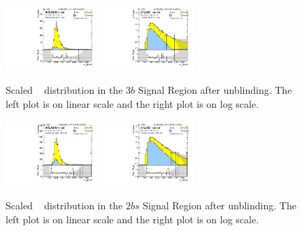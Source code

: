 \begin{figure}[htbp!]
\begin{center}
\includegraphics[width=0.31\textwidth,angle=-90]{figures/boosted/Signal_Syst/Moriond_bkg_9_ThreeTag_Signal_mHH_pole.pdf}
\includegraphics[width=0.31\textwidth,angle=-90]{figures/boosted/Signal_Syst/Moriond_bkg_9_ThreeTag_Signal_mHH_pole_1.pdf}  
  \caption{Scaled \mtwoJ~ distribution in the $3b$ Signal Region after unblinding. The left plot is on linear scale and the right plot is on log scale.}
  \label{fig:boosted-3b-signal-pole}
\end{center}
\end{figure}

\begin{figure}[htbp!]
\begin{center}
\includegraphics[width=0.31\textwidth,angle=-90]{figures/boosted/Signal_Syst/Moriond_bkg_9_TwoTag_split_Signal_mHH_pole.pdf}
\includegraphics[width=0.31\textwidth,angle=-90]{figures/boosted/Signal_Syst/Moriond_bkg_9_TwoTag_split_Signal_mHH_pole_1.pdf}  
  \caption{Scaled \mtwoJ~ distribution in the $2bs$ Signal Region after unblinding. The left plot is on linear scale and the right plot is on log scale.}
  \label{fig:boosted-2b-signal-pole}
\end{center}
\end{figure}



